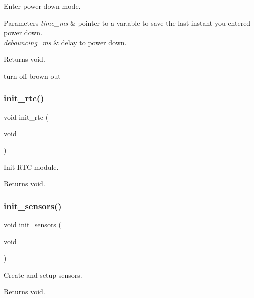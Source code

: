 Enter power down mode. 


\begin{DoxyParams}{Parameters}
{\em time\+\_\+ms} & pointer to a variable to save the last instant you entered power down. \\
\hline
{\em debouncing\+\_\+ms} & delay to power down. \\
\hline
\end{DoxyParams}
\begin{DoxyReturn}{Returns}
void. 
\end{DoxyReturn}
turn off brown-\/out \mbox{\label{i2c-rain_8h_a88533ad02465ce52d4e6de7b2095ec32}} 
\subsubsection{\texorpdfstring{init\+\_\+rtc()}{init\_rtc()}}
{\footnotesize\ttfamily void init\+\_\+rtc (\begin{DoxyParamCaption}\item[{void}]{ }\end{DoxyParamCaption})}



Init R\+TC module. 

\begin{DoxyReturn}{Returns}
void. 
\end{DoxyReturn}
\mbox{\label{i2c-rain_8h_ad7577ba7f06f417a019b69da8682ede5}} 
\subsubsection{\texorpdfstring{init\+\_\+sensors()}{init\_sensors()}}
{\footnotesize\ttfamily void init\+\_\+sensors (\begin{DoxyParamCaption}\item[{void}]{ }\end{DoxyParamCaption})}



Create and setup sensors. 

\begin{DoxyReturn}{Returns}
void. 
\end{DoxyReturn}
\mbox{\label{i2c-rain_8h_a4454f968b2402a0e61deb15ab2571dab}} 
